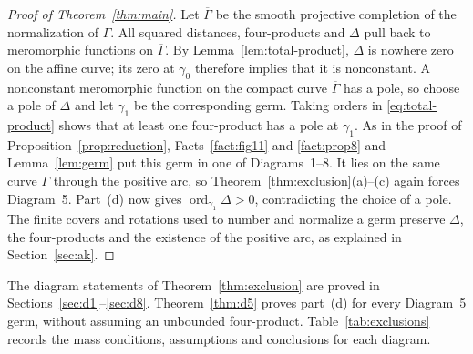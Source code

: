 \documentclass[11pt]{amsart}
\theoremstyle{definition}
\theoremstyle{remark}
\newcommand{\ord}{\operatorname{ord}}
\begin{document}
{\begin{proof}[Proof of Theorem~\ref{thm:main}]
Let $\overline\Gamma$ be the smooth projective completion of the normalization of $\Gamma$.
All squared distances, four-products and $\Delta$ pull back to meromorphic functions on
$\overline\Gamma$.  By Lemma~\ref{lem:total-product}, $\Delta$ is nowhere zero on the affine
curve; its zero at $\gamma_0$ therefore implies that it is nonconstant.  A nonconstant
meromorphic function on the compact curve $\overline\Gamma$ has a pole, so choose a pole
of $\Delta$ and let $\gamma_1$ be the corresponding germ.  Taking orders in
\eqref{eq:total-product} shows that at least one four-product has a pole at $\gamma_1$.
As in the proof of Proposition~\ref{prop:reduction}, Facts~\ref{fact:fig11} and
\ref{fact:prop8} and Lemma~\ref{lem:germ} put this germ in one of Diagrams~1--8.
It lies on the same curve $\Gamma$ through the positive arc, so
Theorem~\ref{thm:exclusion}(a)--(c) again forces Diagram~5.  Part~(d) now gives
$\ord_{\gamma_1}\Delta>0$, contradicting the choice of a pole.
The finite covers and rotations used to number and normalize a germ preserve $\Delta$,
the four-products and the existence of the positive arc, as explained in Section~\ref{sec:ak}.
\end{proof}

The diagram statements of Theorem~\ref{thm:exclusion} are proved in
Sections~\ref{sec:d1}--\ref{sec:d8}.  Theorem~\ref{thm:d5} proves part~(d) for every
Diagram~5 germ, without assuming an unbounded four-product.
Table~\ref{tab:exclusions} records the mass conditions, assumptions and conclusions for each
diagram.

\begin{table}[ht]


\end{table}}
\end{document}
